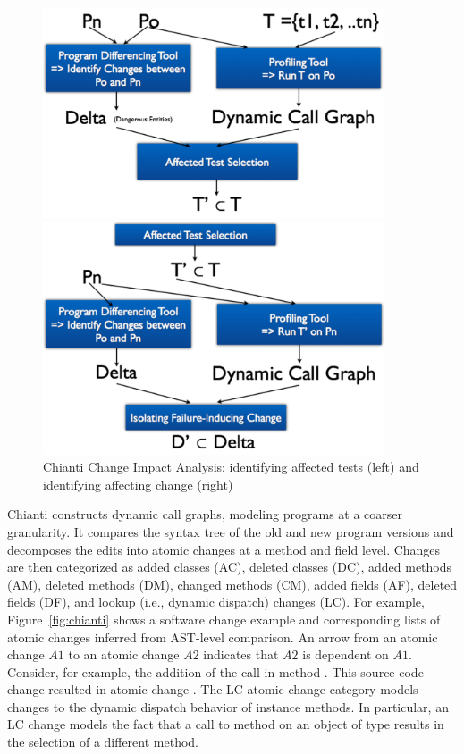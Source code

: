 \begin{figure}
\centering
\begin{minipage}{.45\textwidth}
  \centering
\includegraphics[width=0.9\textwidth]{images/ChiantiPhase1.pdf}
\end{minipage}
\begin{minipage}{.45\textwidth}
  \centering
\includegraphics[width=0.9\textwidth]{images/ChiantiPhase2.pdf}
\end{minipage}
\caption{Chianti Change Impact Analysis: identifying affected tests (left) and identifying affecting change (right)} 
\label{fig:twophase} 
\end{figure}

Chianti constructs dynamic call graphs, modeling programs at a coarser granularity. It compares the syntax tree of the old and new program versions and decomposes the edits into atomic changes at a method and field level. Changes are then categorized as added classes (AC), deleted classes (DC), added methods (AM), deleted methods (DM), changed methods (CM), added fields (AF), deleted fields (DF), and lookup (i.e., dynamic dispatch) changes (LC). For example, Figure~\ref{fig:chianti} shows a software change example and corresponding lists of atomic changes inferred from AST-level comparison. An arrow from an atomic change $A1$ to an atomic change $A2$ indicates that $A2$ is dependent on $A1$. Consider, for example, the addition of the call  in method . This source code change resulted in atomic change . The LC atomic change category models changes to the dynamic dispatch behavior of instance methods. In particular, an LC change  models the fact that a call to method  on an object of type  results in the selection of a different method.

